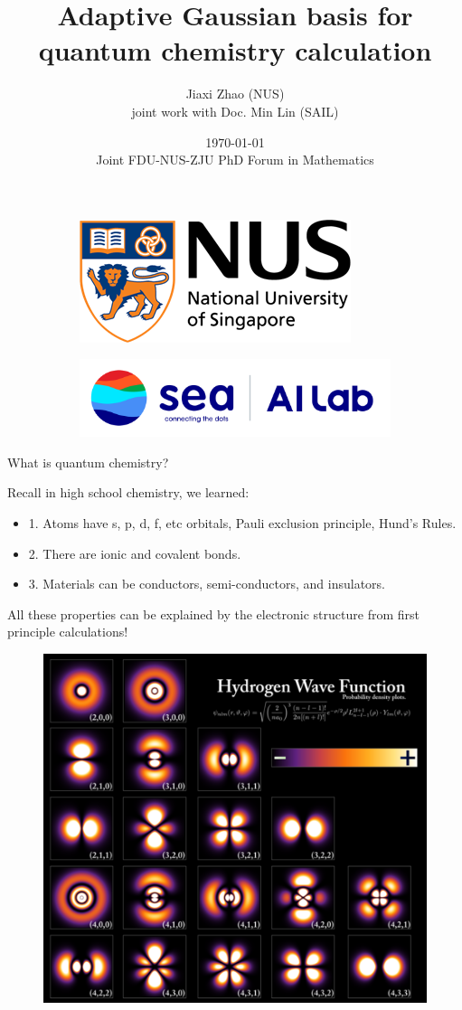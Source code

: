 \documentclass[aspectratio=169]{beamer}
\title[Gaussian Hartree-Fock]{Adaptive Gaussian basis for quantum chemistry calculation}
\author[J. Zhao]{Jiaxi Zhao (NUS)\\joint work with Doc. Min Lin (SAIL)}
\date[\today]{\today\\
Joint FDU-NUS-ZJU
PhD Forum in Mathematics}
\begin{document}
\par \setlength{\parindent}{2em}

\begin{frame}
\titlepage
\begin{figure}[ht]
	\centering
	\begin{subfigure}[b]{0.32\textwidth}
		\includegraphics[width=.8\textwidth]{fig/nus-logo-horizon.png}
	\end{subfigure}
	\begin{subfigure}[b]{0.32\textwidth}
		\includegraphics[width=.8\textwidth]{fig/sail_logo.png}
	\end{subfigure}
\end{figure}
\end{frame}

\begin{frame}{What is quantum chemistry?}

	Recall in high school chemistry, we learned:
	\begin{itemize}
		\item 1. Atoms have s, p, d, f, etc orbitals, Pauli exclusion principle, Hund's Rules.
		\item 2. There are ionic and covalent bonds.
		\item 3. Materials can be conductors, semi-conductors, and insulators.
	\end{itemize}

	{\color{red} All these properties can be explained by the electronic structure from
	first principle calculations!}

	\begin{figure}[ht]
	\centering
		\includegraphics[width=.4\textwidth]{fig/qc.png}
\end{figure}
	
\end{frame}
\end{document}
